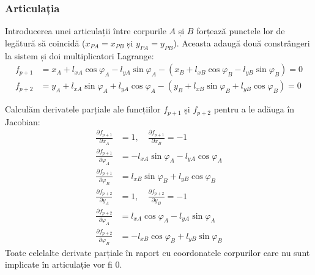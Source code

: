 \documentclass[12pt, a4paper]{article}
\begin{document}
\subsubsection{Articulația}
Introducerea unei articulații între corpurile $A$ și $B$ forțează punctele lor de legătură să coincidă ($x_{PA} = x_{PB}$ și $y_{PA} = y_{PB}$). Aceasta adaugă două constrângeri la sistem și doi multiplicatori Lagrange:
\begin{equation}
    \begin{aligned}
        f_{p+1} &= x_A + l_{xA}\cos\varphi_A - l_{yA}\sin\varphi_A - (x_B + l_{xB}\cos\varphi_B - l_{yB}\sin\varphi_B) = 0 \\
        f_{p+2} &= y_A + l_{xA}\sin\varphi_A + l_{yA}\cos\varphi_A - (y_B + l_{xB}\sin\varphi_B + l_{yB}\cos\varphi_B) = 0
    \end{aligned}
\end{equation}

Calculăm derivatele parțiale ale funcțiilor $f_{p+1}$ și $f_{p+2}$ pentru a le adăuga în Jacobian:
\begin{equation}
    \begin{aligned}
        \frac{\partial f_{p+1}}{\partial x_A} &= 1, \quad \frac{\partial f_{p+1}}{\partial x_B} = -1 \\
        \frac{\partial f_{p+1}}{\partial \varphi_A} &= -l_{xA}\sin\varphi_A - l_{yA}\cos\varphi_A \\
        \frac{\partial f_{p+1}}{\partial \varphi_B} &= l_{xB}\sin\varphi_B + l_{yB}\cos\varphi_B
    \end{aligned}
\end{equation}
\begin{equation}
    \begin{aligned}
        \frac{\partial f_{p+2}}{\partial y_A} &= 1, \quad \frac{\partial f_{p+2}}{\partial y_B} = -1 \\
        \frac{\partial f_{p+2}}{\partial \varphi_A} &= l_{xA}\cos\varphi_A - l_{yA}\sin\varphi_A \\
        \frac{\partial f_{p+2}}{\partial \varphi_B} &= -l_{xB}\cos\varphi_B + l_{yB}\sin\varphi_B
    \end{aligned}
\end{equation}
Toate celelalte derivate parțiale în raport cu coordonatele corpurilor care nu sunt implicate în articulație vor fi $0$.
\end{document}

